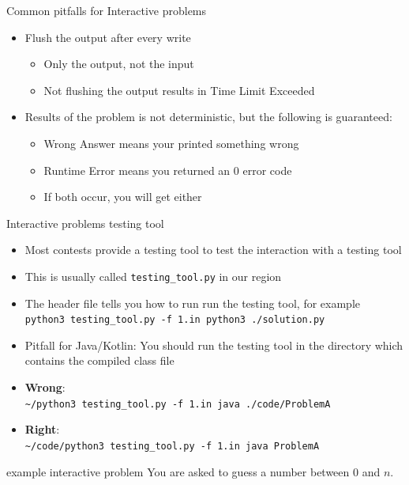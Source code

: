 \documentclass[11pt,pdf, aspectratio=169]{beamer}
\begin{document}
  \begin{frame}{Common pitfalls for Interactive problems}
    \begin{itemize}
      \item Flush the output after every write
      \begin{itemize}
        \item Only the output, not the input
        \item Not flushing the output results in Time Limit Exceeded
      \end{itemize}
      \item Results of the problem is not deterministic, but the following is guaranteed:
      \begin{itemize}
        \item Wrong Answer means your printed something wrong
        \item Runtime Error means you returned an 0 error code
        \item If both occur, you will get either
      \end{itemize}
    \end{itemize}
  \end{frame}
  \begin{frame}{Interactive problems testing tool}
    \begin{itemize}
      \item Most contests provide a testing tool to test the interaction with a testing tool
      \item This is usually called \texttt{testing\_tool.py} in our region
      \item The header file tells you how to run run the testing tool, for example\\\texttt{\textdollar python3 testing\_tool.py -f 1.in python3 ./solution.py}
      \item Pitfall for Java/Kotlin: You should run the testing tool in the directory which contains the compiled class file

      \item \textbf{Wrong}:\\\texttt{\textasciitilde/\textdollar python3 testing\_tool.py -f 1.in java ./code/ProblemA}
      \item \textbf{Right}:\\\texttt{\textasciitilde/code/\textdollar python3 testing\_tool.py -f 1.in java ProblemA}
    \end{itemize}
  \end{frame}
  \begin{frame}{example interactive problem}
    You are asked to guess a number between 0 and $n$.
  \end{frame}
\end{document}
